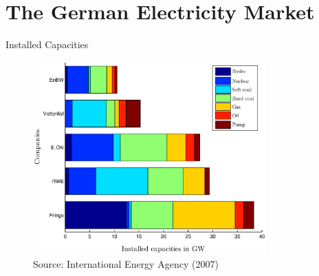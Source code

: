 \section{The German Electricity Market}


\begin{frame}{Installed Capacities}
					
\begin{figure}[h]
  \centering
\includegraphics[width=0.8\textwidth]{capacities}
  \label{fig:capacities}
\\
\vspace{0.1cm}
\scriptsize Source: International Energy Agency (2007)
\end{figure}

\end{frame}


